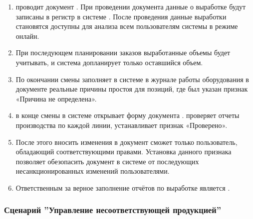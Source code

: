 \begin{enumerate}
\item	\operator  проводит документ . При проведении документа данные о выработке будут записаны в регистр  в системе \gofro. После проведения данные выработки становятся доступны для анализа всем пользователям системы \gofro в режиме онлайн.
\item	При последующем планировании заказов выработанные объемы \planner будет учитывать, и система \gofro допланирует только оставшийся объем.
\item	По окончании смены \operator  заполняет в системе \gofro в журнале работы оборудования в документе   реальные причины простоя для позиций, где был указан признак «Причина не определена».
\item	\master  в конце смены в системе \gofro открывает форму документа .  \master  проверяет отчеты производства по каждой линии, устанавливает признак «Проверено». 
\item	 После этого вносить изменения в документ сможет только пользователь, обладающий соответствующими правами. Установка данного признака позволяет обезопасить документ в системе \gofro от последующих несанкционированных изменений пользователями.
\item	Ответственным за верное заполнение отчётов по выработке является \master .



\end{enumerate}





\subsubsection{Сценарий ''Управление несоответствующей продукцией''}
\label{bp:production_30}

